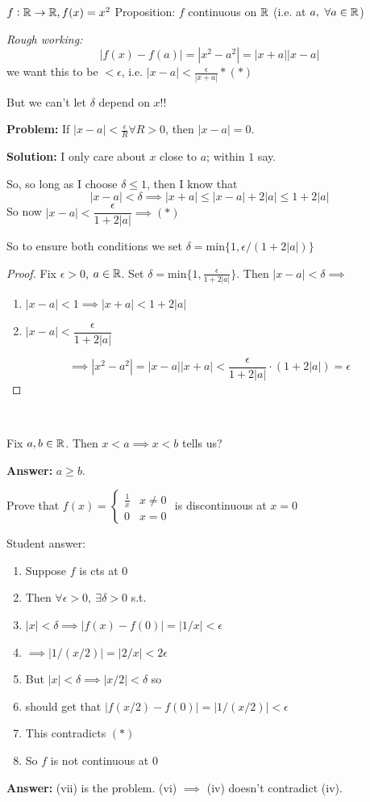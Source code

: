 \documentclass[twoside]{scrartcl}
\begin{document}
\begin{example}
$f: \mathbb{R}\to \mathbb{R}, f(x) = x^2$
Proposition: $f$ continuous on $\mathbb{R}$ (i.e. at $a,~\forall a \in\mathbb{R}$)

\emph{Rough working:} 
\[|f(x) - f(a)| = |x^2-a^2| = |x+a||x-a|\]
we want this to be $< \epsilon$, i.e. $|x-a| < \frac{\epsilon}{|x+a|} *(*)$

But we can't let $\delta$ depend on $x$!!

\textbf{Problem:} If $|x-a| < \frac{\epsilon}{R} \forall R>0$, then $|x-a| =0$.

\textbf{Solution:} I only care about $x$ close to $a$; within $1$ say.


So, so long as I choose $\delta \leq 1$, then I know that 
\[|x-a| < \delta \implies |x+a| \leq |x-a| + 2|a| \leq 1 + 2|a|\]
So now $|x-a| < \dfrac{\epsilon}{1 + 2|a|} \implies (*)$

So to ensure both conditions we set $\delta = \mathrm{min}\{1,\epsilon/(1+2|a|)\}$

\begin{proof}
Fix $\epsilon >0$, $a \in\mathbb{R}$. Set $\delta = \mathrm{min}\{1,\frac{\epsilon}{1 + 2|a|}\}$. Then $|x-a| < \delta \implies$
\begin{enumerate}
\item $|x-a| < 1 \implies |x+a| < 1 + 2|a|$
\item $|x-a| < \dfrac{\epsilon}{1 + 2|a|}$
\end{enumerate}

\[\implies |x^2 -a^2| = |x-a||x+a| < \dfrac{\epsilon}{1+2|a|}\cdot(1+2|a|) = \epsilon\]
\end{proof}
\end{example}~

\begin{clicker}
Fix $a,b \in\mathbb{R}$. Then $x < a \implies x < b$ tells us? 

\textbf{Answer:} $a \geq b$. 

Prove that $f(x) = \begin{cases}
 	\frac{1}{x} & x \neq 0\\
 	0 & x = 0
 \end{cases}$
 is discontinuous at $x = 0$

Student answer:
\begin{enumerate}
\item Suppose $f$ is cts at $0$
\item Then $\forall \epsilon >0,~\exists \delta > 0$ s.t.
\item $|x| < \delta \implies |f(x) - f(0)| = |1/x| < \epsilon$
\item $\implies |1/(x/2)| = |2/x| < 2\epsilon$
\item But $|x| < \delta \implies |x/2| < \delta$ so
\item should get that $|f(x/2) - f(0)| = |1/(x/2)| < \epsilon$
\item This contradicts $(*)$	
\item So $f$ is not continuous at $0$
\end{enumerate}

\textbf{Answer:} (vii) is the problem. (vi) $\implies$ (iv) doesn't contradict (iv).
\end{clicker}
\end{document}

